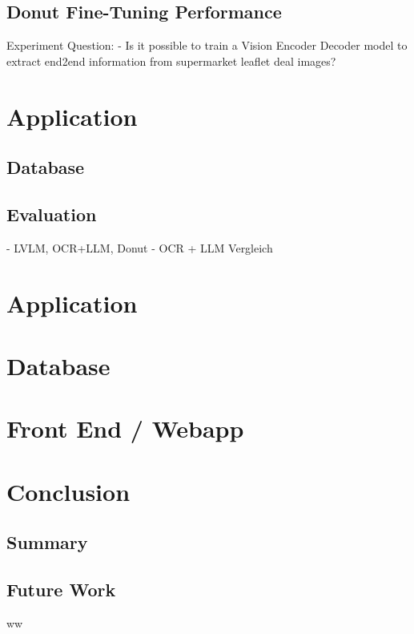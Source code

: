 \documentclass[11pt]{article}
\begin{document}




\subsection{Donut Fine-Tuning Performance}
Experiment Question:
- Is it possible to train a Vision Encoder Decoder model to extract end2end information from supermarket leaflet deal images?

\section{Application}

\subsection{Database}




    \subsection{Evaluation}
    - LVLM, OCR+LLM, Donut
    - OCR + LLM Vergleich

\section{Application}
    \section{Database}
    \section{Front End / Webapp}

\section{Conclusion}
    \subsection{Summary}
    \subsection{Future Work}
    ww

%

\end{document}

